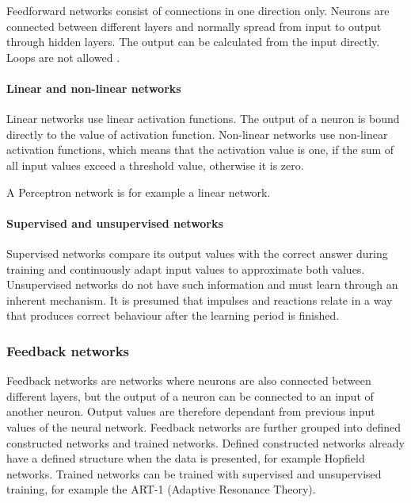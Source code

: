Feedforward networks consist of connections in one direction only.
Neurons are connected between different layers and normally spread from
input to output through hidden layers. The output can be calculated from
the input directly. Loops are not allowed \cite{haun1998simulation}.

\paragraph{Linear and non-linear
networks}\label{linear-and-non-linear-networks}

Linear networks use linear activation functions. The output of a neuron
is bound directly to the value of activation function. Non-linear
networks use non-linear activation functions, which means that the
activation value is one, if the sum of all input values exceed a
threshold value, otherwise it is zero. \cite{haun1998simulation}

A Perceptron network is for example a linear network.

\paragraph{Supervised and unsupervised
networks}\label{supervised-and-unsupervised-networks}

Supervised networks compare its output values with the correct answer
during training and continuously adapt input values to approximate both
values. Unsupervised networks do not have such information and must
learn through an inherent mechanism. It is presumed that impulses and
reactions relate in a way that produces correct behaviour after the
learning period is finished. \cite{haun1998simulation}

\subsubsection{Feedback networks}\label{feedback-networks}

Feedback networks are networks where neurons are also connected between
different layers, but the output of a neuron can be connected to an
input of another neuron. Output values are therefore dependant from
previous input values of the neural network. \cite{haun1998simulation}
Feedback networks are further grouped into defined constructed networks
and trained networks. Defined constructed networks already have a
defined structure when the data is presented, for example Hopfield
networks. Trained networks can be trained with supervised and
unsupervised training, for example the ART-1 (Adaptive Resonance
Theory). \cite{haun1998simulation}

